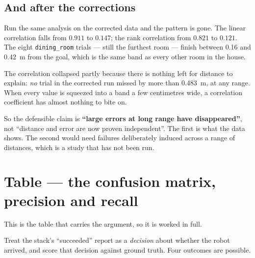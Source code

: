 \documentclass[11pt,a4paper]{report}
\newcommand{\file}[1]{\texttt{\small #1}}
\begin{document}
\subsection{And after the corrections}

Run the same analysis on the corrected data and the pattern is gone. The
linear correlation falls from $0.911$ to $0.147$; the rank correlation from
$0.821$ to $0.121$. The eight \file{dining\_room} trials --- still the
furthest room --- finish between \SI{0.16}{} and \SI{0.42}{\metre} from the
goal, which is the same band as every other room in the house.

\begin{warnbox}
The correlation collapsed partly because there is nothing left for distance to
explain: \emph{no} trial in the corrected run missed by more than
\SI{0.483}{\metre}, at any range. When every value is squeezed into a band a
few centimetres wide, a correlation coefficient has almost nothing to bite on.

So the defensible claim is \textbf{``large errors at long range have
disappeared''}, not ``distance and error are now proven independent''. The
first is what the data shows. The second would need failures deliberately
induced across a range of distances, which is a study that has not been run.
\end{warnbox}

\section{Table --- the confusion matrix, precision and recall}
\label{sec:hand-confusion}

This is the table that carries the argument, so it is worked in full.

Treat the stack's ``succeeded'' report as a \emph{decision} about whether the
robot arrived, and score that decision against ground truth. Four outcomes are
possible.
\end{document}
